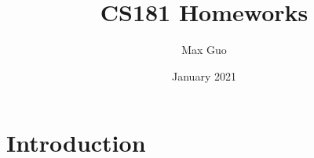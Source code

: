 \documentclass{article}
\title{CS181 Homeworks}
\author{Max Guo}
\date{January 2021}
\begin{document}
\maketitle

\section{Introduction}
\end{document}
